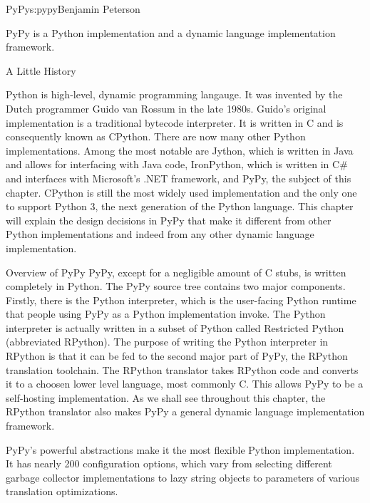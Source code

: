 \begin{aosachapter}{PyPy}{s:pypy}{Benjamin Peterson}

PyPy is a Python implementation and a dynamic language implementation framework.

\begin{aosasect1}{A Little History}

Python is high-level, dynamic programming langauge. It was invented by the Dutch
programmer Guido van Rossum in the late 1980s. Guido's original implementation
is a traditional bytecode interpreter. It is written in C and is consequently
known as CPython. There are now many other Python implementations. Among the
most notable are Jython, which is written in Java and allows for interfacing
with Java code, IronPython, which is written in C\# and interfaces with
Microsoft's .NET framework, and PyPy, the subject of this chapter. CPython is
still the most widely used implementation and the only one to support Python 3,
the next generation of the Python language. This chapter will explain the design
decisions in PyPy that make it different from other Python implementations and
indeed from any other dynamic language implementation.

\end{aosasect1}

\begin{aosasect1}{Overview of PyPy}
PyPy, except for a negligible amount of C stubs, is written completely in
Python. The PyPy source tree contains two major components. Firstly, there is
the Python interpreter, which is the user-facing Python runtime that people
using PyPy as a Python implementation invoke. The Python interpreter is actually
written in a subset of Python called Restricted Python (abbreviated
RPython). The purpose of writing the Python interpreter in RPython is that it
can be fed to the second major part of PyPy, the RPython translation
toolchain. The RPython translator takes RPython code and converts it to a
choosen lower level language, most commonly C. This allows PyPy to be a
self-hosting implementation. As we shall see throughout this chapter, the
RPython translator also makes PyPy a general dynamic language implementation
framework.

PyPy's powerful abstractions make it the most flexible Python implementation. It
has nearly 200 configuration options, which vary from selecting different
garbage collector implementations to lazy string objects to parameters of
various translation optimizations.


\end{aosasect1}
\end{aosachapter}
